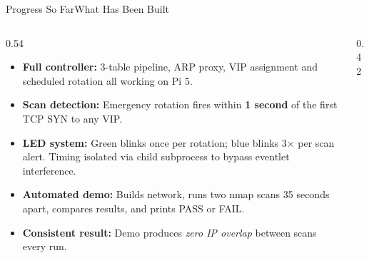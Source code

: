 \documentclass[aspectratio=169,10pt]{beamer}
\begin{document}
\begin{frame}{Progress So Far}{What Has Been Built}
  \begin{columns}[T]
    \begin{column}{0.54\textwidth}
      \begin{itemize}\setlength\itemsep{6pt}
        \item[$\checkmark$] \textbf{Full controller:} 3-table pipeline, ARP proxy, VIP assignment and scheduled rotation all working on Pi 5.
        \item[$\checkmark$] \textbf{Scan detection:} Emergency rotation fires within \textbf{1 second} of the first TCP SYN to any VIP.
        \item[$\checkmark$] \textbf{LED system:} Green blinks once per rotation; blue blinks 3$\times$ per scan alert. Timing isolated via child subprocess to bypass eventlet interference.
        \item[$\checkmark$] \textbf{Automated demo:} Builds network, runs two nmap scans 35 seconds apart, compares results, and prints PASS or FAIL.
        \item[$\checkmark$] \textbf{Consistent result:} Demo produces \emph{zero IP overlap} between scans every run.
      \end{itemize}
    \end{column}
    \begin{column}{0.42\textwidth}
      \vspace{0.35cm}
\end{column}
\end{columns}
\end{frame}
\end{document}
